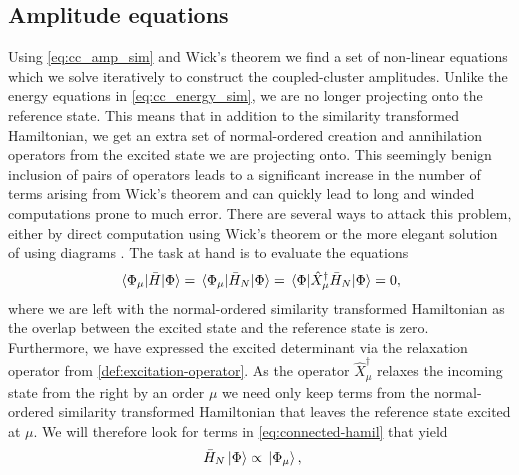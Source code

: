         \subsection{Amplitude equations}
            Using \autoref{eq:cc_amp_sim} and Wick's theorem we find a set of
            non-linear equations which we solve iteratively to construct the
            coupled-cluster amplitudes.
            Unlike the energy equations in \autoref{eq:cc_energy_sim}, we are no
            longer projecting onto the reference state.
            This means that in addition to the similarity transformed
            Hamiltonian, we get an extra set of normal-ordered creation and
            annihilation operators from the excited state we are projecting
            onto.
            This seemingly benign inclusion of pairs of operators leads to a
            significant increase in the number of terms arising from Wick's
            theorem and can quickly lead to long and winded computations prone
            to much error.
            There are several ways to attack this problem, either by direct
            computation using Wick's theorem \cite{crawford2000introduction} or
            the more elegant solution of using diagrams
            \cite{crawford2000introduction, shavitt2009many}.
            The task at hand is to evaluate the equations
            \begin{align}
                \mel*{\Phi_{\mu}}{\bar{H}}{\Phi}
                = \mel*{\Phi_{\mu}}{\bar{H}_N}{\Phi}
                = \mel*{\Phi}{
                    \hat{X}^{\dagger}_{\mu}\bar{H}_N
                }{\Phi}
                = 0,
            \end{align}
            where we are left with the normal-ordered similarity transformed
            Hamiltonian as the overlap between the excited state and the
            reference state is zero.
            Furthermore, we have expressed the excited determinant via the
            relaxation operator from \autoref{def:excitation-operator}.
            As the operator $\hat{X}^{\dagger}_{\mu}$ relaxes the incoming state
            from the right by an order $\mu$ we need only keep terms from the
            normal-ordered similarity transformed Hamiltonian that leaves the
            reference state excited at $\mu$.
            We will therefore look for terms in \autoref{eq:connected-hamil}
            that yield
            \begin{align}
                \bar{H}_N\ket*{\Phi}
                &\propto \ket*{\Phi_{\mu}},
            \end{align}
